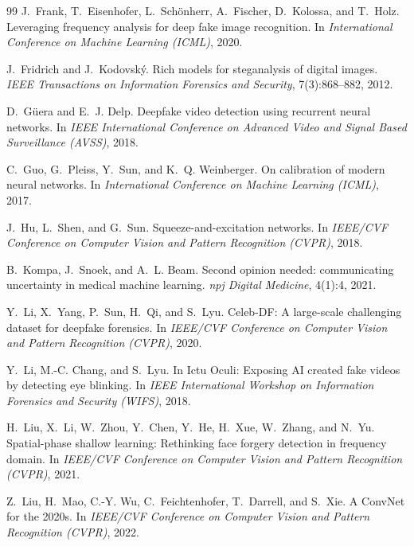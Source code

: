 \documentclass[10pt,twocolumn,letterpaper]{article}
\begin{document}
\begin{thebibliography}{99}
J.~Frank, T.~Eisenhofer, L.~Sch{\"o}nherr, A.~Fischer, D.~Kolossa, and T.~Holz.
\newblock Leveraging frequency analysis for deep fake image recognition.
\newblock In \emph{International Conference on Machine Learning (ICML)}, 2020.

J.~Fridrich and J.~Kodovsk{\'y}.
\newblock Rich models for steganalysis of digital images.
\newblock \emph{IEEE Transactions on Information Forensics and Security}, 7(3):868--882, 2012.

D.~G{\"u}era and E.~J. Delp.
\newblock Deepfake video detection using recurrent neural networks.
\newblock In \emph{IEEE International Conference on Advanced Video and Signal Based Surveillance (AVSS)}, 2018.

C.~Guo, G.~Pleiss, Y.~Sun, and K.~Q. Weinberger.
\newblock On calibration of modern neural networks.
\newblock In \emph{International Conference on Machine Learning (ICML)}, 2017.

J.~Hu, L.~Shen, and G.~Sun.
\newblock Squeeze-and-excitation networks.
\newblock In \emph{IEEE/CVF Conference on Computer Vision and Pattern Recognition (CVPR)}, 2018.

B.~Kompa, J.~Snoek, and A.~L. Beam.
\newblock Second opinion needed: communicating uncertainty in medical machine learning.
\newblock \emph{npj Digital Medicine}, 4(1):4, 2021.

Y.~Li, X.~Yang, P.~Sun, H.~Qi, and S.~Lyu.
\newblock Celeb-{DF}: A large-scale challenging dataset for deepfake forensics.
\newblock In \emph{IEEE/CVF Conference on Computer Vision and Pattern Recognition (CVPR)}, 2020.

Y.~Li, M.-C. Chang, and S.~Lyu.
\newblock In {I}ctu {O}culi: Exposing {AI} created fake videos by detecting eye blinking.
\newblock In \emph{IEEE International Workshop on Information Forensics and Security (WIFS)}, 2018.

H.~Liu, X.~Li, W.~Zhou, Y.~Chen, Y.~He, H.~Xue, W.~Zhang, and N.~Yu.
\newblock Spatial-phase shallow learning: Rethinking face forgery detection in frequency domain.
\newblock In \emph{IEEE/CVF Conference on Computer Vision and Pattern Recognition (CVPR)}, 2021.

Z.~Liu, H.~Mao, C.-Y. Wu, C.~Feichtenhofer, T.~Darrell, and S.~Xie.
\newblock A {C}onv{N}et for the 2020s.
\newblock In \emph{IEEE/CVF Conference on Computer Vision and Pattern Recognition (CVPR)}, 2022.


\end{thebibliography}
\end{document}
